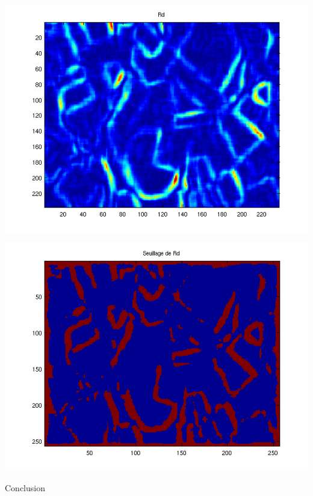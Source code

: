 \documentclass{beamer}
\begin{document}
\begin{frame}
\begin{center}
\includegraphics[scale=0.6]{capture4/partie4_07.png}
\end{center}
\end{frame}

\begin{frame}
\begin{center}
\includegraphics[scale=0.6]{capture4/partie4_08.png}
\end{center}
\end{frame}


\begin{frame}
\begin{center}
    Conclusion
\end{center}
\end{frame}
\end{document}
